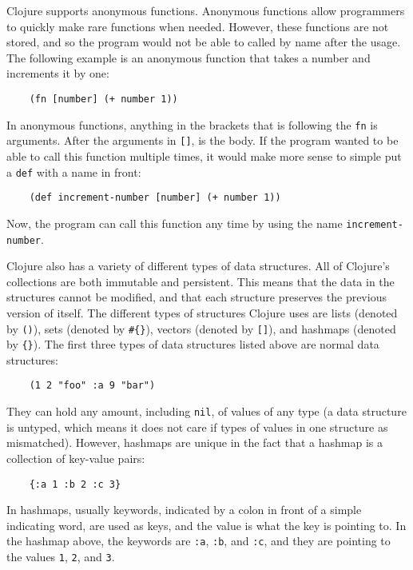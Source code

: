 \documentclass[12pt]{article}
\begin{document}
Clojure supports anonymous functions. Anonymous functions allow programmers to quickly make rare functions when needed. However, these functions are not  stored, and so the program would not be able to called by name after the usage. The following example is an anonymous function that takes a number and increments it by one:
\begin{verbatim}
	(fn [number] (+ number 1))
\end{verbatim}

In anonymous functions, anything in the brackets that is following the \texttt{fn} is arguments. After the arguments in \texttt{[]}, is the body. If the program wanted to be able to call this function multiple times, it would make more sense to simple put a \texttt{def} with a name in front:
\begin{verbatim}
	(def increment-number [number] (+ number 1))
\end{verbatim}

Now, the program can call this function any time by using the name \texttt{increment-number}.

Clojure also has a variety of different types of data structures. All of Clojure's collections are both immutable and persistent. This means that the data in the structures cannot be modified, and that each structure preserves the previous version of itself. The different types of structures Clojure uses are lists (denoted by \texttt{()}), sets (denoted by \texttt{\#\{\}}), vectors (denoted by \texttt{[]}), and hashmaps (denoted by \texttt{\{\}}). The first three types of data structures listed above are normal data structures:
\begin{verbatim}
	(1 2 "foo" :a 9 "bar")
\end{verbatim}

They can hold any amount, including \texttt{nil}, of values of any type (a data structure is untyped, which means it does not care if types of values in one structure as mismatched). However, hashmaps are unique in the fact that a hashmap is a collection of key-value pairs:
\begin{verbatim}
	{:a 1 :b 2 :c 3}
\end{verbatim}

In hashmaps, usually keywords, indicated by a colon in front of a simple indicating word, are used as keys, and the value is what the key is pointing to. In the hashmap above, the keywords are \texttt{:a}, \texttt{:b}, and \texttt{:c}, and they are pointing to the values \texttt{1}, \texttt{2}, and \texttt{3}.
\end{document}
